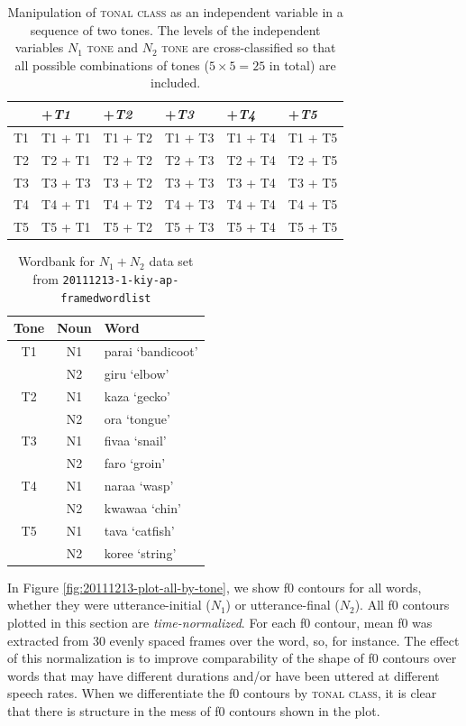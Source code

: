 \documentclass[12pt]{article}
\begin{document}
\begin{table}[!h]
  \centering
  \begin{tabular}{l | l l l l l}
     & +\textit{T1} & +\textit{T2} & +\textit{T3} & +\textit{T4} & +\textit{T5} \\\hline
     T1 & T1 + T1 & T1 + T2 & T1 + T3 & T1 + T4 & T1 + T5\\
     T2 & T2 + T1 & T2 + T2 & T2 + T3 & T2 + T4 & T2 + T5\\
     T3 & T3 + T3 & T3 + T2 & T3 + T3 & T3 + T4 & T3 + T5\\
     T4 & T4 + T1 & T4 + T2 & T4 + T3 & T4 + T4 & T4 + T5\\
     T5 & T5 + T1 & T5 + T2 & T5 + T3 & T5 + T4 & T5 + T5\\
  \end{tabular}
  \caption{Manipulation of \textsc{tonal class} as an independent
    variable in a sequence of two tones. The levels of the independent
    variables  $N_1$
    \textsc{tone} and $N_2$ \textsc{tone} are cross-classified
    so that all possible combinations of tones ($5 \times 5 = 25$ in
    total) are included.}
  \label{tab:factorial-kiy}
\end{table}

\begin{table}[!h]
  \centering
  \begin{tabular}{c | c l}
    Tone& Noun & Word \\\hline
    T1 & N1 & parai `bandicoot'\\
     & N2 & giru `elbow'\\\hline
    T2 & N1 & kaza `gecko'\\
     & N2 & ora `tongue'\\\hline
    T3 & N1 & fivaa `snail'\\
     & N2 & faro `groin'\\\hline
    T4 & N1 & naraa `wasp'\\
     & N2 & kwawaa `chin'\\\hline
    T5 & N1 & tava `catfish'\\
     & N2 & koree `string'\\\hline
  \end{tabular}
  \caption{Wordbank for $N_1+N_2$ data set from \texttt{20111213-1-kiy-ap-framedwordlist}}
  \label{tab:kiy-wordbank}
\end{table}

In Figure \ref{fig:20111213-plot-all-by-tone}, we show f0 contours for
all words, whether they were utterance-initial ($N_1$) or
utterance-final ($N_2$). All f0 contours plotted in this section are
\textit{time-normalized}. For each f0 contour, mean f0 was extracted from 30 evenly
spaced frames over the word, so, for instance. The effect of this normalization is to
improve comparability of the shape of f0 contours over words that may
have different durations and/or have been uttered at different speech
rates. When we differentiate the f0 contours by \textsc{tonal class},
it is clear that there is structure in the mess of f0 contours shown
in the plot. 
\end{document}
